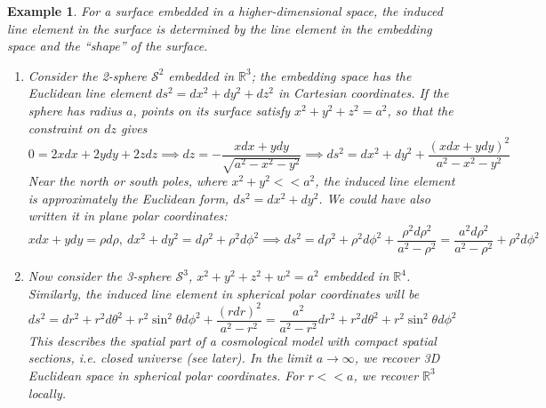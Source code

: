 \documentclass[a4paper]{article}
\newtheorem{eg}{Example}[section]
\theoremstyle{new}
\begin{document}
\begin{eg}
For a surface embedded in a higher-dimensional space,
the induced line element in the surface is determined by the line element in the embedding space and the “shape” of the surface.
\begin{enumerate}
    \item Consider the 2-sphere $\mathcal{S}^2$ embedded in $\mathbb{R}^3$; the embedding space has the Euclidean line element $ds^2 = dx^2 + dy^2 +dz^2$ in Cartesian coordinates. If the sphere has radius $a$, points on its surface satisfy $x^2+y^2+z^2=a^2$, so that the constraint on $dz$ gives
    $$0=2xdx+2ydy+2zdz\implies dz=-\frac{xdx+ydy}{\sqrt{a^2-x^2-y^2}}\implies ds^2=dx^2+dy^2+\frac{(xdx+ydy)^2}{a^2-x^2-y^2}$$
    Near the north or south poles, where $x^2+y^2<<a^2$, the induced line element is approximately the Euclidean form, $ds^2=dx^2+dy^2$. We could have also written it in plane polar coordinates:
    $$xdx+ydy=\rho d\rho,~dx^2+dy^2=d\rho^2+\rho^2d\phi^2\implies ds^2=d\rho^2+\rho^2d\phi^2+\frac{\rho^2d\rho^2}{a^2-\rho^2}=\frac{a^2d\rho^2}{a^2-\rho^2}+\rho^2d\phi^2$$
    \item Now consider the 3-sphere $\mathcal{S}^3$, $x^2+y^2+z^2+w^2=a^2$ embedded in $\mathbb{R}^4$. Similarly, the induced line element in spherical polar coordinates will be
    \begin{equation}
    ds^2=dr^2+r^2d\theta^2+r^2\sin^2\theta d\phi^2+\frac{(rdr)^2}{a^2-r^2}=\frac{a^2}{a^2-r^2}dr^2+r^2d\theta^2+r^2\sin^2\theta d\phi^2\label{3-sphere}
    \end{equation}
    This describes the spatial part of a cosmological model with compact spatial sections, i.e. closed universe (see later). In the limit $a\rightarrow\infty$, we recover 3D Euclidean space in spherical polar coordinates. For $r<<a$, we recover $\mathbb{R}^3$ locally.
\end{enumerate}
\end{eg}
\end{document}
